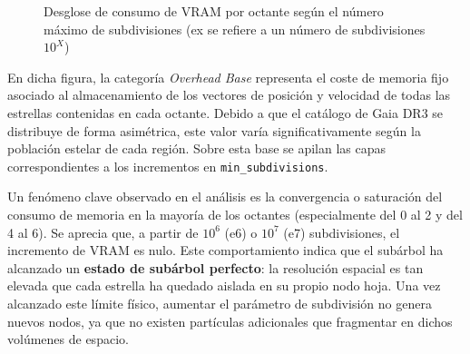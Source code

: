 \begin{figure}[h!]
    \caption{Desglose de consumo de VRAM por octante según el número máximo de subdivisiones (ex se refiere a un número de subdivisiones $10^X$)}
    \label{fig:vram_octantes}
\end{figure}

En dicha figura, la categoría \textit{Overhead Base} representa el coste de memoria fijo asociado al almacenamiento de los vectores de posición y velocidad de todas las estrellas contenidas en cada octante.
Debido a que el catálogo de Gaia DR3 se distribuye de forma asimétrica, este valor varía significativamente según la población estelar de cada región.
Sobre esta base se apilan las capas correspondientes a los incrementos en \texttt{min\_subdivisions}.

Un fenómeno clave observado en el análisis es la convergencia o saturación del consumo de memoria en la mayoría de los octantes (especialmente del 0 al 2 y del 4 al 6).
Se aprecia que, a partir de $10^6$ (e6) o $10^7$ (e7) subdivisiones, el incremento de VRAM es nulo.
Este comportamiento indica que el subárbol ha alcanzado un \textbf{estado de subárbol perfecto}: la resolución espacial es tan elevada que cada estrella ha quedado aislada en su propio nodo hoja.
Una vez alcanzado este límite físico, aumentar el parámetro de subdivisión no genera nuevos nodos, ya que no existen partículas adicionales que fragmentar en dichos volúmenes de espacio.


